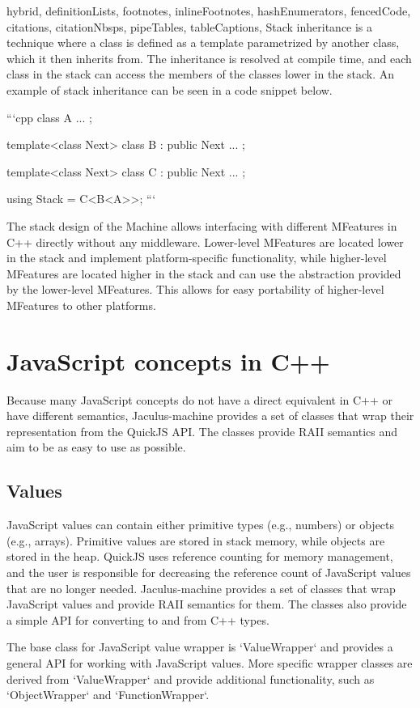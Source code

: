 \begin{markdown*}{%
  hybrid,
  definitionLists,
  footnotes,
  inlineFootnotes,
  hashEnumerators,
  fencedCode,
  citations,
  citationNbsps,
  pipeTables,
  tableCaptions,
}
Stack inheritance is a technique where a class is defined as a template parametrized by another class, which it then inherits from. The inheritance is resolved at compile time, and each class in the stack can access the members of the classes lower in the stack. An example of stack inheritance can be seen in a code snippet below.

```cpp
class A { ... };

template<class Next>
class B : public Next { ... };

template<class Next>
class C : public Next { ... };

using Stack = C<B<A>>;
```

The stack design of the Machine allows interfacing with different MFeatures in C++ directly without any middleware. Lower-level MFeatures are located lower in the stack and implement platform-specific functionality, while higher-level MFeatures are located higher in the stack and can use the abstraction provided by the lower-level MFeatures. This allows for easy portability of higher-level MFeatures to other platforms.

\section{JavaScript concepts in C++}

Because many JavaScript concepts do not have a direct equivalent in C++ or have different semantics, Jaculus-machine provides a set of classes that wrap their representation from the QuickJS API. The classes provide RAII semantics and aim to be as easy to use as possible.

\subsection{Values}

JavaScript values can contain either primitive types (e.g., numbers) or objects (e.g., arrays). Primitive values are stored in stack memory, while objects are stored in the heap. QuickJS uses reference counting for memory management, and the user is responsible for decreasing the reference count of JavaScript values that are no longer needed. Jaculus-machine provides a set of classes that wrap JavaScript values and provide RAII semantics for them. The classes also provide a simple API for converting to and from C++ types.

The base class for JavaScript value wrapper is `ValueWrapper` and provides a general API for working with JavaScript values. More specific wrapper classes are derived from `ValueWrapper` and provide additional functionality, such as `ObjectWrapper` and `FunctionWrapper`.


\end{markdown*}
